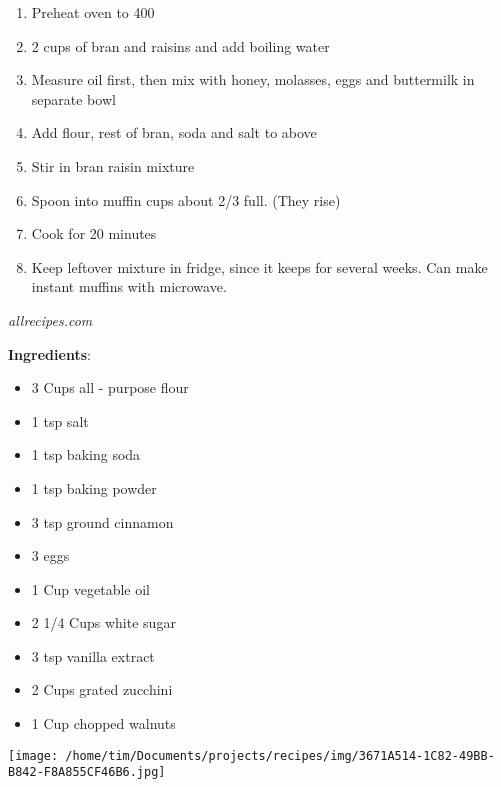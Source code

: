 \documentclass[11pt, twoside, openany]{book}
\begin{document}
\vspace{-3mm}\begin{enumerate}\setlength\itemsep{-1mm}
\item Preheat oven to 400
\item 2 cups of bran and raisins and add boiling water
\item Measure oil first, then mix with honey, molasses, eggs and buttermilk in separate bowl
\item Add flour, rest of bran, soda and salt to above
\item Stir in bran raisin mixture
\item Spoon into muffin cups about 2/3 full. (They rise)
\item Cook for 20 minutes
\item Keep leftover mixture in fridge, since it keeps for several weeks. Can make instant muffins with microwave.
\end{enumerate}
 \label{zucchini-bread}\hfill\textit{allrecipes.com}\\
\begin{minipage}[t]{0.8\linewidth}
\textbf{Ingredients}:\vspace{-3mm}
\begin{multicols}{2}
\begin{itemize}\setlength\itemsep{-1mm}
\item 3 Cups all - purpose flour
\item 1 tsp salt
\item 1 tsp baking soda
\item 1 tsp baking powder
\item 3 tsp ground cinnamon
\item 3 eggs
\item 1 Cup vegetable oil
\item 2 1/4 Cups white sugar
\item 3 tsp vanilla extract
\item 2 Cups grated zucchini
\item 1 Cup chopped walnuts
\end{itemize}
\end{multicols}
\end{minipage}
\begin{minipage}[t]{0.2\linewidth}
\centering \strut\vspace*{-\baselineskip}\newline
\texttt{[image: /home/tim/Documents/projects/recipes/img/3671A514-1C82-49BB-B842-F8A855CF46B6.jpg]}\\
\end{minipage}\vspace{3mm}
\end{document}
